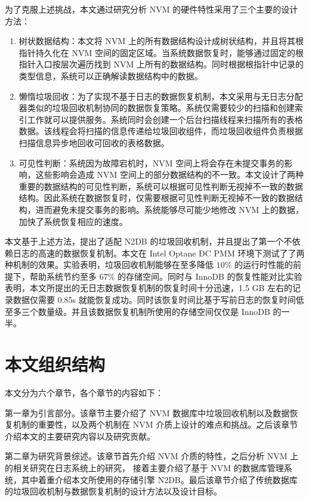 为了克服上述挑战，本文通过研究分析 NVM 的硬件特性采用了三个主要的设计方法：

\begin{enumerate}
    \item 树状数据结构：本文将 NVM 上的所有数据结构设计成树状结构，并且将其根指针持久化在 NVM 空间的固定区域。当系统数据恢复时，能够通过固定的根指针入口按层次遍历找到 NVM 上所有的数据结构。同时根据根指针中记录的类型信息，系统可以正确解读数据结构中的数据。
    \item 懒惰垃圾回收：为了实现不基于日志的数据恢复机制，本文采用与无日志分配器类似的垃圾回收机制协同的数据恢复策略。系统仅需要较少的扫描和创建索引工作就可以提供服务。系统同时会创建一个后台扫描线程来扫描所有的表格数据。该线程会将扫描的信息传递给垃圾回收组件，而垃圾回收组件负责根据扫描信息异步地回收可回收的表格数据。
    \item 可见性判断：系统因为故障宕机时，NVM 空间上将会存在未提交事务的影响，这些影响会造成 NVM 空间上的部分数据结构的不一致。本文设计了两种重要的数据结构的可见性判断，系统可以根据可见性判断无视掉不一致的数据结构。因此系统在数据恢复时，仅需要根据可见性判断无视掉不一致的数据结构，进而避免未提交事务的影响。系统能够尽可能少地修改 NVM 上的数据，加快了系统恢复相应的速度。
\end{enumerate}

本文基于上述方法，提出了适配 N2DB 的垃圾回收机制，并且提出了第一个不依赖日志的高速的数据恢复机制。本文在 Intel Optane DC PMM 环境下测试了了两种机制的效果。实验表明，垃圾回收机制能够在至多降低 $10\%$ 的运行时性能的前提下，帮助系统节约至多 $67\%$ 的存储空间。同时与 InnoDB 的恢复性能对比实验表明，本文所提出的无日志数据恢复机制的恢复时间十分迅速，1.5 GB 左右的记录数据仅需要 0.85s 就能恢复成功。同时该恢复时间比基于写前日志的恢复时间低至多三个数量级。并且该数据恢复机制所使用的存储空间仅仅是 InnoDB 的一半。

\section{本文组织结构}

本文分为六个章节，各个章节的内容如下：

第一章为引言部分。该章节主要介绍了 NVM 数据库中垃圾回收机制以及数据恢复机制的重要性，以及两个机制在 NVM 介质上设计的难点和挑战。之后该章节介绍本文的主要研究内容以及研究贡献。

第二章为研究背景综述。该章节首先介绍 NVM 介质的特性，之后分析 NVM 上的相关研究在日志系统上的研究，
接着主要介绍了基于 NVM 的数据库管理系统，其中着重介绍本文所使用的存储引擎 N2DB。最后该章节介绍了传统数据库的垃圾回收机制与数据恢复机制的设计方法以及设计目标。

